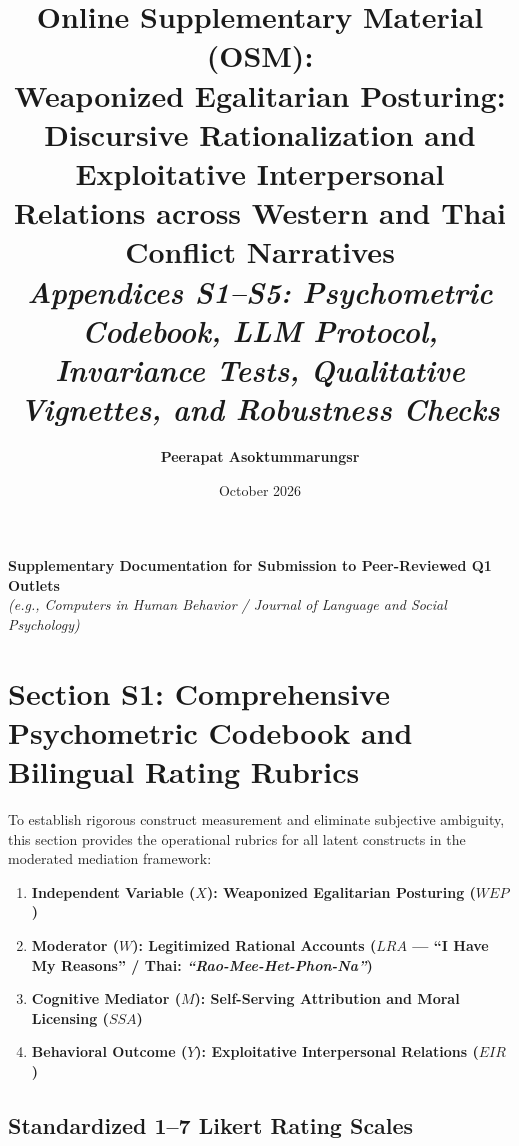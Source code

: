 \documentclass[11pt,a4paper]{article}
\title{\textbf{\Large Online Supplementary Material (OSM):\\Weaponized Egalitarian Posturing: Discursive Rationalization and Exploitative Interpersonal Relations across Western and Thai Conflict Narratives}\\[1.5ex]
\large \textit{Appendices S1--S5: Psychometric Codebook, LLM Protocol, Invariance Tests, Qualitative Vignettes, and Robustness Checks}}
\author{\textbf{Peerapat Asoktummarungsr}}
\date{October 2026}
\begin{document}
\maketitle
\thispagestyle{fancy}

\begin{center}
\small \textbf{Supplementary Documentation for Submission to Peer-Reviewed Q1 Outlets}\\
\textit{(e.g., Computers in Human Behavior / Journal of Language and Social Psychology)}
\end{center}

\vspace{2ex}
\tableofcontents
\newpage

\section{Section S1: Comprehensive Psychometric Codebook and Bilingual Rating Rubrics}
\label{sec:supp_codebook}

To establish rigorous construct measurement and eliminate subjective ambiguity, this section provides the operational rubrics for all latent constructs in the moderated mediation framework:
\begin{enumerate}
    \item \textbf{Independent Variable ($X$): Weaponized Egalitarian Posturing ($WEP$)}
    \item \textbf{Moderator ($W$): Legitimized Rational Accounts ($LRA$ --- ``I Have My Reasons'' / Thai: \textit{``Rao-Mee-Het-Phon-Na''})}
    \item \textbf{Cognitive Mediator ($M$): Self-Serving Attribution and Moral Licensing ($SSA$)}
    \item \textbf{Behavioral Outcome ($Y$): Exploitative Interpersonal Relations ($EIR$)}
\end{enumerate}

\subsection{Standardized 1--7 Likert Rating Scales}
\end{document}
